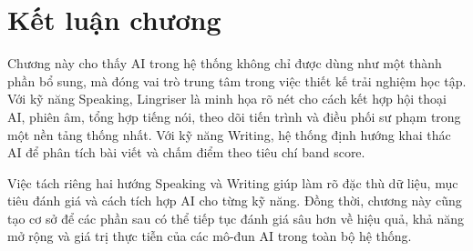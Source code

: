 \section{Kết luận chương}
Chương này cho thấy AI trong hệ thống không chỉ được dùng như một thành phần bổ sung, mà đóng vai trò trung tâm trong việc thiết kế trải nghiệm học tập. Với kỹ năng Speaking, Lingriser là minh họa rõ nét cho cách kết hợp hội thoại AI, phiên âm, tổng hợp tiếng nói, theo dõi tiến trình và điều phối sư phạm trong một nền tảng thống nhất. Với kỹ năng Writing, hệ thống định hướng khai thác AI để phân tích bài viết và chấm điểm theo tiêu chí band score.

Việc tách riêng hai hướng Speaking và Writing giúp làm rõ đặc thù dữ liệu, mục tiêu đánh giá và cách tích hợp AI cho từng kỹ năng. Đồng thời, chương này cũng tạo cơ sở để các phần sau có thể tiếp tục đánh giá sâu hơn về hiệu quả, khả năng mở rộng và giá trị thực tiễn của các mô-đun AI trong toàn bộ hệ thống.